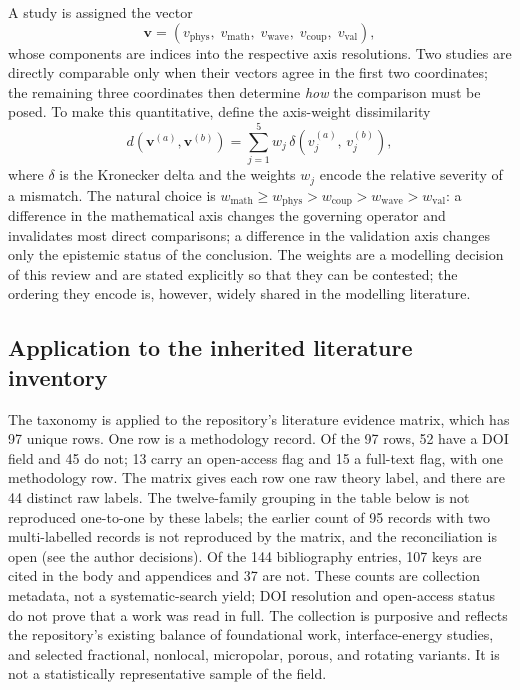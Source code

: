 A study is assigned the vector
\begin{equation}
\bm{v} = \left(v_{\text{phys}},\; v_{\text{math}},\; v_{\text{wave}},\; v_{\text{coup}},\; v_{\text{val}}\right),
\label{eq:14.1}
\end{equation}
whose components are indices into the respective axis resolutions. Two studies are directly comparable only when their vectors agree in the first two coordinates; the remaining three coordinates then determine \emph{how} the comparison must be posed. To make this quantitative, define the axis-weight dissimilarity
\begin{equation}
d(\bm{v}^{(a)},\bm{v}^{(b)}) = \sum_{j=1}^{5} w_j \,\delta\!\left(v^{(a)}_j,\, v^{(b)}_j\right),
\label{eq:14.2}
\end{equation}
where $\delta$ is the Kronecker delta and the weights $w_j$ encode the relative severity of a mismatch. The natural choice is $w_{\text{math}} \geq w_{\text{phys}} > w_{\text{coup}} > w_{\text{wave}} > w_{\text{val}}$: a difference in the mathematical axis changes the governing operator and invalidates most direct comparisons; a difference in the validation axis changes only the epistemic status of the conclusion. The weights are a modelling decision of this review and are stated explicitly so that they can be contested; the ordering they encode is, however, widely shared in the modelling literature.

\subsection{Application to the inherited literature inventory}
\label{sec:14.3}

The taxonomy is applied to the repository's literature evidence matrix, which has 97 unique rows. One row is a methodology record. Of the 97 rows, 52 have a DOI field and 45 do not; 13 carry an open-access flag and 15 a full-text flag, with one methodology row. The matrix gives each row one raw theory label, and there are 44 distinct raw labels. The twelve-family grouping in the table below is not reproduced one-to-one by these labels; the earlier count of 95 records with two multi-labelled records is not reproduced by the matrix, and the reconciliation is open (see the author decisions). Of the 144 bibliography entries, 107 keys are cited in the body and appendices and 37 are not. These counts are collection metadata, not a systematic-search yield; DOI resolution and open-access status do not prove that a work was read in full. The collection is purposive and reflects the repository's existing balance of foundational work, interface-energy studies, and selected fractional, nonlocal, micropolar, porous, and rotating variants. It is not a statistically representative sample of the field.

